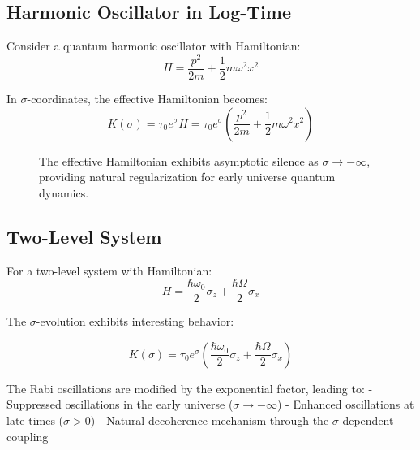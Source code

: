 \documentclass[11pt,a4paper]{article}
\begin{document}
\subsection{Harmonic Oscillator in Log-Time}

Consider a quantum harmonic oscillator with Hamiltonian:
\begin{equation}
H = \frac{p^2}{2m} + \frac{1}{2}m\omega^2 x^2
\end{equation}

In $\sigma$-coordinates, the effective Hamiltonian becomes:
\begin{equation}
K(\sigma) = \tau_0 e^{\sigma} H = \tau_0 e^{\sigma} \left(\frac{p^2}{2m} + \frac{1}{2}m\omega^2 x^2\right)
\end{equation}

\begin{figure}[h]
\centering
{}
\caption{The effective Hamiltonian exhibits asymptotic silence as $\sigma \to -\infty$, providing natural regularization for early universe quantum dynamics.}
\end{figure}

\subsection{Two-Level System}

For a two-level system with Hamiltonian:
\begin{equation}
H = \frac{\hbar\omega_0}{2} \sigma_z + \frac{\hbar\Omega}{2} \sigma_x
\end{equation}

The $\sigma$-evolution exhibits interesting behavior:

\begin{equation}
K(\sigma) = \tau_0 e^{\sigma} \left(\frac{\hbar\omega_0}{2} \sigma_z + \frac{\hbar\Omega}{2} \sigma_x\right)
\end{equation}

The Rabi oscillations are modified by the exponential factor, leading to:
- Suppressed oscillations in the early universe ($\sigma \to -\infty$)
- Enhanced oscillations at late times ($\sigma > 0$)
- Natural decoherence mechanism through the $\sigma$-dependent coupling
\end{document}
